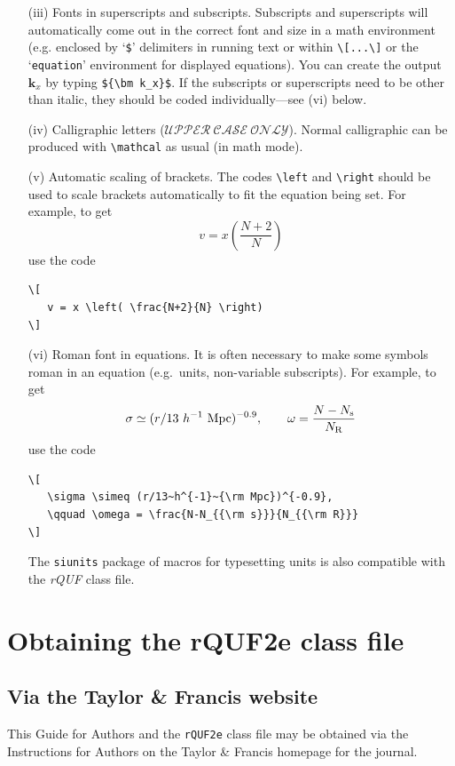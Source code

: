 \documentclass{rQUF2e}
\theoremstyle{plain}
\theoremstyle{definition}
\theoremstyle{remark}
\begin{document}
\begin{enumerate}
\item[(iii)] Fonts in superscripts and subscripts. Subscripts and superscripts will automatically come  out in the correct font
and size in a math environment (e.g. enclosed by `\verb"$"'
delimiters in running text or within \verb"\[...\]" or the
`\texttt{equation}' environment for displayed equations). You can create
the output ${\bm k_x}$ by typing \verb"${\bm k_x}$". If the
subscripts or superscripts need to be other than italic, they
should be coded individually---see (vi) below.

\item[(iv)] Calligraphic letters ($\mathcal{UPPER\ CASE\ ONLY}$).
Normal calligraphic can be produced with \verb"\mathcal" as usual (in math mode).

\item[(v)] Automatic scaling of brackets. The codes \verb"\left" and
\verb"\right" should  be used to scale brackets automatically to
fit the equation being set. For example, to get
\[
   v = x \left( \frac{N+2}{N} \right)
\]
use the code
\begin{verbatim}
\[
   v = x \left( \frac{N+2}{N} \right)
\]
\end{verbatim}

\item[(vi)] Roman font in equations. It is often necessary to make some
symbols roman in an equation (e.g.\ units, non-variable
subscripts). For example, to get
\[
   \sigma \simeq (r/13~h^{-1}~{\rm Mpc})^{-0.9},
   \qquad \omega = \frac{N-N_{\rm s}}{N_{\rm R}}
\]
use the code
\begin{verbatim}
\[
   \sigma \simeq (r/13~h^{-1}~{\rm Mpc})^{-0.9},
   \qquad \omega = \frac{N-N_{{\rm s}}}{N_{{\rm R}}}
\]
\end{verbatim}
The \texttt{siunits} package of macros for typesetting units is also compatible with the \textit{rQUF} class file.
\end{enumerate}


\section{Obtaining the rQUF2e class file}\label{FTP}

\subsection{Via the Taylor \& Francis website}

This Guide for Authors and the \texttt{rQUF2e} class file may be obtained via the Instructions for Authors on the Taylor \& Francis homepage for the journal.
\end{document}
